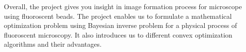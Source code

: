 Overall, the project gives you insight in image formation process for microscope using fluoroscent beads. The project enables us to formulate a mathematical optimization problem using Bayesian inverse problem for a physical process of fluoroscent microscopy. It also introduces us to different convex optimization algorithms and their advantages.
